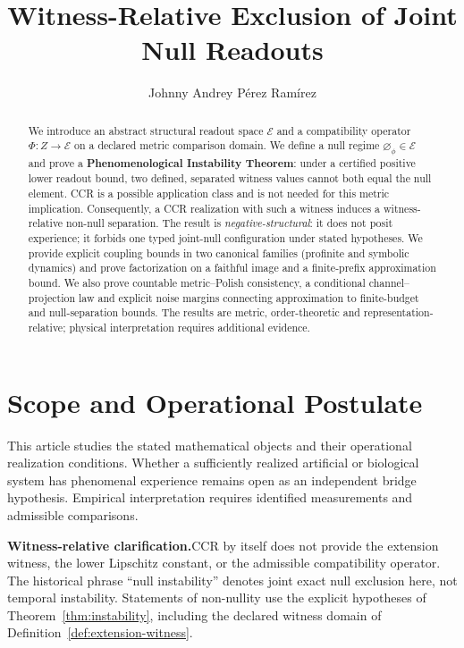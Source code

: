 \documentclass[11pt,a4paper]{article}
\title{\textbf{Witness-Relative Exclusion of Joint Null Readouts}}
\author{Johnny Andrey P\'{e}rez Ram\'{i}rez}
\date{}
\theoremstyle{plain}
\theoremstyle{definition}
\theoremstyle{remark}
\newcommand{\E}{\mathcal{E}}
\newcommand{\nullphi}{\varnothing_\phi}
\begin{document}
\setlength{\emergencystretch}{3em}
\maketitle

\begin{abstract}
We introduce an abstract structural readout space $\E$ and a compatibility operator $\Phi: Z \to \E$ on a declared metric comparison domain. We define a null regime $\nullphi \in \E$ and prove a \textbf{Phenomenological Instability Theorem}: under a certified positive lower readout bound, two defined, separated witness values cannot both equal the null element. CCR is a possible application class and is not needed for this metric implication. Consequently, a CCR realization with such a witness induces a witness-relative non-null separation. The result is \emph{negative-structural}: it does not posit experience; it forbids one typed joint-null configuration under stated hypotheses. We provide explicit coupling bounds in two canonical families (profinite and symbolic dynamics) and prove factorization on a faithful image and a finite-prefix approximation bound. We also prove countable metric--Polish consistency, a conditional channel--projection law and explicit noise margins connecting approximation to finite-budget and null-separation bounds. The results are metric, order-theoretic and representation-relative; physical interpretation requires additional evidence.
\end{abstract}

\section*{Scope and Operational Postulate}
This article studies the stated mathematical objects and their operational
realization conditions. Whether a sufficiently realized artificial or biological
system has phenomenal experience remains open as an independent bridge
hypothesis. Empirical interpretation requires identified measurements and
admissible comparisons.

\noindent\textbf{Witness-relative clarification.}\enspace CCR by itself does not provide the extension witness, the lower Lipschitz constant, or the admissible compatibility operator. The historical phrase ``null instability'' denotes joint exact null exclusion here, not temporal instability. Statements of non-nullity use the explicit hypotheses of Theorem~\ref{thm:instability}, including the declared witness domain of Definition~\ref{def:extension-witness}. 
\end{document}
